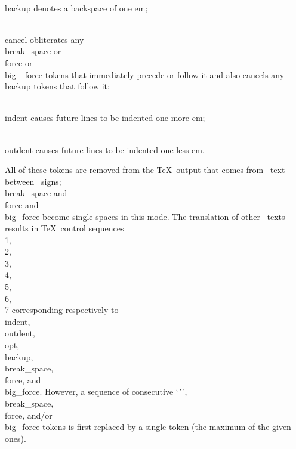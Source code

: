 \yskip\hang \\{backup} denotes a backspace of one em;

\yskip\hang \\{cancel} obliterates any \\{break\_space} or \\{force} or \\{big%
\_force}
tokens that immediately precede or follow it and also cancels any
\\{backup} tokens that follow it;

\yskip\hang \\{indent} causes future lines to be indented one more em;

\yskip\hang \\{outdent} causes future lines to be indented one less em.

\yskip\noindent All of these tokens are removed from the \TeX\ output that
comes from \PASCAL\ text between \pb\ signs; \\{break\_space} and \\{force} and
\\{big\_force} become single spaces in this mode. The translation of other
\PASCAL\ texts results in \TeX\ control sequences \.{\\1}, \.{\\2},
\.{\\3}, \.{\\4}, \.{\\5}, \.{\\6}, \.{\\7} corresponding respectively to
\\{indent}, \\{outdent}, \\{opt}, \\{backup}, \\{break\_space}, \\{force}, and
\\{big\_force}. However, a sequence of consecutive `\.\ ', \\{break\_space},
\\{force}, and/or \\{big\_force} tokens is first replaced by a single token
(the maximum of the given ones).


